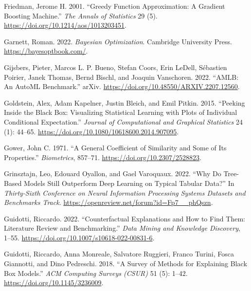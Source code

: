 \begin{CSLReferences}{1}{0}
\leavevmode{}%
Friedman, Jerome H. 2001. {``Greedy Function Approximation: A Gradient
Boosting Machine.''} \emph{The Annals of Statistics} 29 (5).
\url{https://doi.org/10.1214/aos/1013203451}.

\leavevmode{}%
Garnett, Roman. 2022. \emph{Bayesian Optimization}. Cambridge University
Press. \url{https://bayesoptbook.com/}.

\leavevmode{}%
Gijsbers, Pieter, Marcos L. P. Bueno, Stefan Coors, Erin LeDell,
Sébastien Poirier, Janek Thomas, Bernd Bischl, and Joaquin Vanschoren.
2022. {``AMLB: An AutoML Benchmark.''} arXiv.
\url{https://doi.org/10.48550/ARXIV.2207.12560}.

\leavevmode{}%
Goldstein, Alex, Adam Kapelner, Justin Bleich, and Emil Pitkin. 2015.
{``Peeking Inside the Black Box: Visualizing Statistical Learning with
Plots of Individual Conditional Expectation.''} \emph{Journal of
Computational and Graphical Statistics} 24 (1): 44--65.
\url{https://doi.org/10.1080/10618600.2014.907095}.

\leavevmode{}%
Gower, John C. 1971. {``A General Coefficient of Similarity and Some of
Its Properties.''} \emph{Biometrics}, 857--71.
\url{https://doi.org/10.2307/2528823}.

\leavevmode{}%
Grinsztajn, Leo, Edouard Oyallon, and Gael Varoquaux. 2022. {``Why Do
Tree-Based Models Still Outperform Deep Learning on Typical Tabular
Data?''} In \emph{Thirty-Sixth Conference on Neural Information
Processing Systems Datasets and Benchmarks Track}.
\url{https://openreview.net/forum?id=Fp7__phQszn}.

\leavevmode{}%
Guidotti, Riccardo. 2022. {``Counterfactual Explanations and How to Find
Them: Literature Review and Benchmarking.''} \emph{Data Mining and
Knowledge Discovery}, 1--55.
\url{https://doi.org/10.1007/s10618-022-00831-6}.

\leavevmode{}%
Guidotti, Riccardo, Anna Monreale, Salvatore Ruggieri, Franco Turini,
Fosca Giannotti, and Dino Pedreschi. 2018. {``A Survey of Methods for
Explaining Black Box Models.''} \emph{ACM Computing Surveys (CSUR)} 51
(5): 1--42. \url{https://doi.org/10.1145/3236009}.


\end{CSLReferences}
